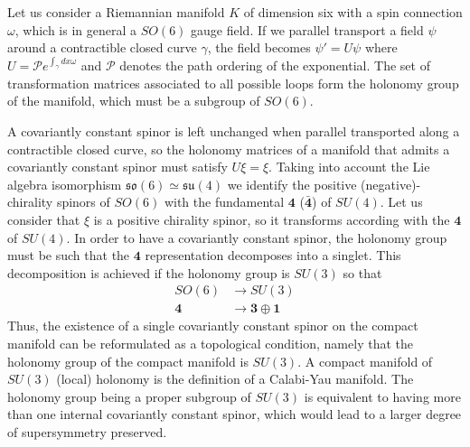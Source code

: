 Let us consider a Riemannian manifold $K$ of dimension six with a spin connection $\omega$, which 
is in general a $SO(6)$ gauge field.
If we parallel transport a field $\psi$ around a contractible closed curve $\gamma$, the field becomes
$\psi'=U\psi$ where $U=\mathcal P e^{\int_\gamma dx \omega}$ and $\mathcal P$ denotes the path ordering of 
the exponential.
The set of transformation matrices associated to all possible loops form the holonomy group of the manifold, 
which must be a subgroup of $SO(6)$.

A covariantly constant spinor is left unchanged when parallel transported along a contractible
closed curve, so the holonomy matrices of a manifold that admits a covariantly constant spinor 
must satisfy $U\xi = \xi$.
Taking into account the Lie algebra isomorphism $\mathfrak{so}(6)\simeq \mathfrak{su}(4)$ we identify the positive
(negative)-chirality spinors of $SO(6)$ with the fundamental $\mathbf 4$ ($\mathbf {\bar 4}$)
of $SU(4)$.
Let us consider that $\xi$ is a positive chirality spinor, so it transforms according with the 
$\mathbf 4$ of $SU(4)$.
In order to have a covariantly constant spinor, the holonomy group must be such that the $\mathbf 4$
representation decomposes into a singlet.
This decomposition is achieved if the holonomy group is $SU(3)$ so that
 \begin{align}
  SO(6)  &\to SU(3)\\
  \mathbf 4 &\to \mathbf 3 \oplus \mathbf 1
\end{align} 
Thus, the existence of a single covariantly constant spinor on the compact manifold can be reformulated
as a topological condition, namely that the holonomy group of the compact manifold is $SU(3)$.
A compact manifold of $SU(3)$ (local) holonomy is the definition of a Calabi-Yau manifold.
The holonomy group being a proper subgroup of $SU(3)$ is equivalent to having more than one internal covariantly 
constant spinor, which would lead to a larger degree of supersymmetry preserved.

